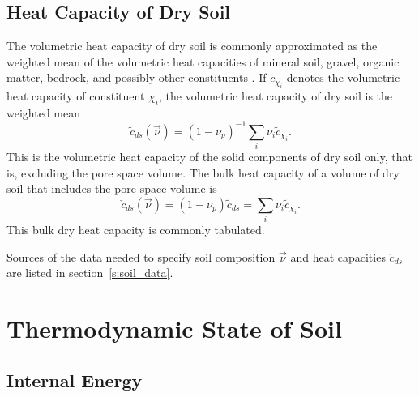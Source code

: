 \documentclass[twoside,10pt]{report}
\begin{document}
\subsection{Heat Capacity of Dry Soil}

The volumetric heat capacity of dry soil is commonly approximated as the weighted mean of the volumetric heat capacities of mineral soil, gravel, organic matter, bedrock, and possibly other constituents \citep{Farouki81a}. If ${\tilde c}_{\chi_i}$ denotes the volumetric heat capacity of constituent $\chi_i$, the volumetric heat capacity of dry soil is the weighted mean 
\begin{equation}\label{e:dry_soil_heat_capacity}
\tilde{c}_{ds} (\vec{\nu}) = (1-\nu_p)^{-1} \sum_i \nu_{i} {\tilde c}_{\chi_i}.
\end{equation}
This is the volumetric heat capacity of the solid components of dry soil only, that is, excluding the pore space volume. The bulk heat capacity of a volume of dry soil that includes the pore space volume is
\begin{equation}\label{e:bulk_dry_heat_capacity}
    \check{c}_{ds} (\vec{\nu})  = (1-\nu_p) \tilde{c}_{ds} = \sum_i \nu_{i} {\tilde c}_{\chi_i}.
\end{equation}
This bulk dry heat capacity is commonly tabulated. 

Sources of the data needed to specify soil composition $\vec{\nu}$ and heat capacities $\check c_{ds}$ are listed in section~\ref{s:soil_data}.

\section{Thermodynamic State of Soil}

\subsection{Internal Energy}
\end{document}
